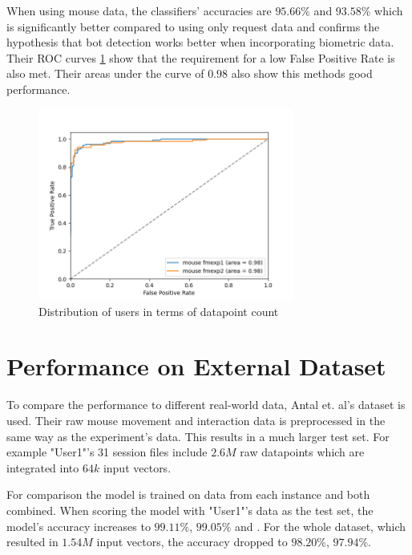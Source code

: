 \documentclass[
    fontsize=12pt,
    headings=small,
    parskip=half,           %
    bibliography=totoc,
    numbers=noenddot,       %
    open=any,               %
    final                   %
]{scrreprt}
\begin{document}
When using mouse data, the classifiers' accuracies are $95.66\%$ and $93.58\%$ which is significantly better compared to using only request data and confirms the hypothesis that bot detection works better when incorporating biometric data. Their ROC curves \ref{fig:roc_mouse_both_instances} show that the requirement for a low False Positive Rate is also met. Their areas under the curve of $0.98$ also show this methods good performance.

\begin{figure}[h]
	\includegraphics[width=0.75\textwidth]{figures/roc_mouse_both_instances.png}
	\caption{Distribution of users in terms of datapoint count}
	\label{fig:roc_mouse_both_instances}
\end{figure}

\section{Performance on External Dataset}

To compare the performance to different real-world data, Antal et. al's dataset \cite{9111596} is used. Their raw mouse movement and interaction data is preprocessed in the same way as the experiment's data. This results in a much larger test set. For example "User1"'s 31 session files include $2.6M$ raw datapoints which are integrated into $64k$ input vectors.

For comparison the model is trained on data from each instance and both combined. When scoring the model with "User1"'s data as the test set, the model's accuracy increases to $99.11\%$, $99.05\%$ and \todo. For the whole dataset, which resulted in $1.54M$ input vectors, the accuracy dropped to $98.20\%$, $97.94\%$.
\end{document}
